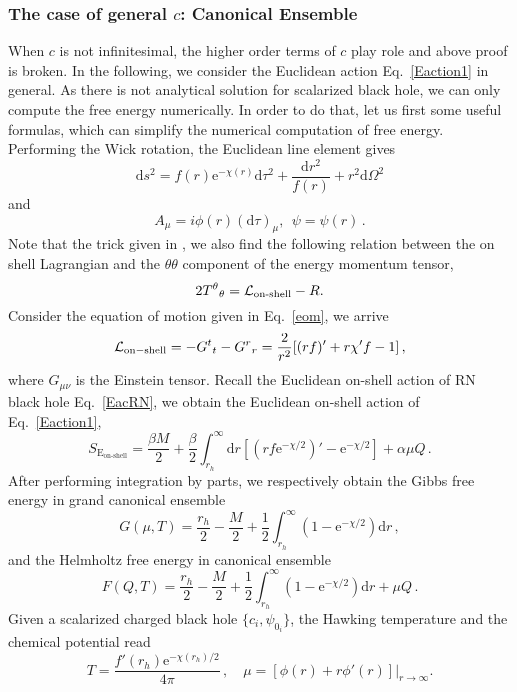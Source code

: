 \documentclass[pr, twocolumn, preprintnumbers, showpacs,footnoteadded, superscriptaddress,nofootinbib,longbibliography]{revtex4-1}
\newcommand{\td}{\mathrm{d}}
\newcommand{\te}{\mathrm{e}}
\begin{document}
\subsubsection{The case of general $c$: Canonical Ensemble}
When $c$ is not infinitesimal, the higher order terms of $c$ play role and above proof is broken. In the following, we consider the Euclidean action Eq.~\eqref{Eaction1} in general. As there is not analytical solution for scalarized black hole, we can only compute the free energy numerically. In order to do that, let us first some useful formulas, which can simplify the numerical computation of free energy. Performing the Wick rotation, the Euclidean line element gives
%
\begin{equation}\label{metric0E}
  \td s^2=f(r)\te^{-\chi(r)}\td \tau^2+\frac{\td r^2}{f(r)}+r^2\td\Omega^2
\end{equation}
%
and
%
\begin{equation}\label{matters1E}
  A_\mu=i\phi(r)(\td \tau)_\mu,~~\psi=\psi(r)\,.
\end{equation}
%
Note that the trick given in \cite{Hartnoll:2008kx}, we also find the following relation between the on shell Lagrangian and the $\theta\theta$ component of the energy momentum tensor,
%
\begin{equation}
2T^{\theta}{}_{\theta}={\cal L_{\text{on-shell}}}-R.
\end{equation}
%
Consider the equation of motion given in Eq.~\eqref{eom}, we arrive
%
\begin{equation}
{\cal L}_{\rm on-shell}=-{G^t}_t-{G^r}_r=\frac2{r^2}[(rf)'+r\chi'f-1] \, ,
\end{equation}
%
where $G_{\mu\nu}$ is the Einstein tensor. Recall the Euclidean on-shell action of RN black hole Eq.~\eqref{EacRN}, we obtain the Euclidean on-shell action of Eq.~\eqref{Eaction1},
%
\begin{equation}
S_{\text{E}_{\text{on-shell}}}=\frac{\beta M}{2}+\frac{\beta}{2} \int^\infty_{r_h} \td r[(rf\te^{-\chi/2})'-\te^{-\chi/2}]+\alpha \mu Q \, .
\end{equation}
%
After performing integration by parts, we respectively obtain the Gibbs free energy in grand canonical ensemble
%
\begin{equation}\label{freeF2}
G(\mu,T)=\frac{r_h}{2}-\frac{M}2+\frac12\int_{r_h}^\infty(1-\te^{-\chi/2})\td r \, ,
\end{equation}
%
and the Helmholtz free energy in canonical ensemble
%
\begin{equation}\label{freeF1}
F(Q,T)=\frac{r_h}2-\frac{M}2+\frac12\int_{r_h}^\infty(1-\te^{-\chi/2})\td r + \mu Q \, .
\end{equation}
%
Given a scalarized charged black hole $\{c_i,\psi_{0_i} \}$, the Hawking temperature and the chemical potential read
%
\begin{equation} \label{Tmu}
T=\frac{f'(r_h)\te^{-\chi(r_h)/2}}{4\pi}\,  , \quad \mu = [\phi(r) + r \phi'(r)]|_{r \to \infty}.
\end{equation}
%
\end{document}
